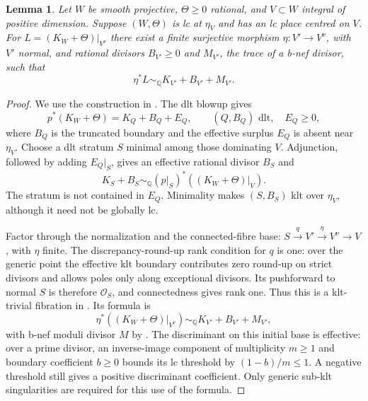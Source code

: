 \documentclass[12pt,a4paper,psamsfonts]{amsart}
\theoremstyle{definition}
\theoremstyle{plain}
\newtheorem{lemma}{Lemma}[section]
\newcommand{\Q}{\mathbb Q}
\newcommand{\OO}{\mathcal O}
\begin{document}
\begin{lemma}\label{lem:finite-subadjunction-model}
Let $W$ be smooth projective, $\Theta\ge0$ rational, and $V\subset W$
integral of positive dimension. Suppose $(W,\Theta)$ is lc at
$\eta_V$ and has an lc place centred on $V$.
For $L=(K_W+\Theta)|_{V^\nu}$ there exist a finite surjective
morphism $\eta:V'\to V^\nu$, with $V'$ normal, and rational
divisors $B_{V'}\ge0$ and $M_{V'}$, the trace of a b-nef divisor,
such that
\[
 \eta^*L\sim_\Q K_{V'}+B_{V'}+M_{V'}.
\]
\end{lemma}
\begin{proof}
We use the construction in \cite[Lemma~7.1]{LA}.
The dlt blowup \cite[Theorem~2.10]{FH} gives
\[
 p^*(K_W+\Theta)=K_Q+B_Q+E_Q,
 \qquad (Q,B_Q)\text{ dlt},\quad E_Q\ge0,
\]
where $B_Q$ is the truncated boundary and the effective surplus
$E_Q$ is absent near $\eta_V$. Choose a dlt stratum $S$ minimal
among those dominating $V$. Adjunction, followed by adding
$E_Q|_S$, gives an effective rational divisor $B_S$ and
\[
 K_S+B_S\sim_\Q(p|_S)^*((K_W+\Theta)|_V).
\]
The stratum is not contained in $E_Q$. Minimality makes
$(S,B_S)$ klt over $\eta_V$, although it need not be globally lc.

Factor through the normalization and the connected-fibre base:
$S\xrightarrow{q}V'\xrightarrow{\eta}V^\nu\to V$, with $\eta$
finite. The discrepancy-round-up rank condition for $q$ is one:
over the generic point the effective klt boundary contributes
zero round-up on strict divisors and allows poles only along
exceptional divisors. Its pushforward to normal $S$ is therefore
$\OO_S$, and connectedness gives rank one. Thus this is a
klt-trivial fibration in \cite[Definition~3.1]{FG}. Its formula is
\[
 \eta^*((K_W+\Theta)|_{V^\nu})
 \sim_\Q K_{V'}+B_{V'}+M_{V'},
\]
with b-nef moduli divisor $M$ by \cite[Theorem~3.5]{FG}.
The discriminant on this initial base is effective: over a prime
divisor, an inverse-image component of multiplicity $m\ge1$ and
boundary coefficient $b\ge0$ bounds its lc threshold by
$(1-b)/m\le1$. A negative threshold still gives a positive
discriminant coefficient. Only generic sub-klt singularities are
required for this use of the formula.
\end{proof}
\end{document}
